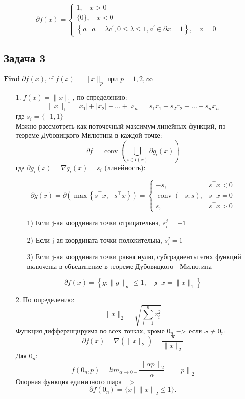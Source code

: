 \documentclass[12pt,letterpaper]{article}
\begin{document}
$$
\partial f(x)=\left\{\begin{array}{l}
1, \quad x>0 \\
\{0\}, \quad x<0 \\
\left\{a \mid a=\lambda a^{\prime}, 0 \leq \lambda \leq 1, a^{\prime} \in \partial x = 1 \right\}, \quad x=0
\end{array}\right.
$$

\subsection*{Задача 3}
$\textbf{Find}$ $\partial f(x)$, if $f(x) = \|x\|_p$ $\textbf{при}$ $p = 1,2, \infty$\\

\begin{itemize}
	\item[1. ] $ f(x) = \| x \|_1 $, по определению:
	$$
\|x\|_{1}=\left|x_{1}\right|+\left|x_{2}\right|+\ldots+\left|x_{n}\right|=s_{1} x_{1}+s_{2} x_{2}+\ldots+s_{n} x_{n}
$$
где $ s_i = \{ -1, 1 \} $\\
Можно рассмотреть как поточечный максимум линейных функций, по теореме Дубовицкого-Милютина в каждой точке:
$$
\partial f=\operatorname{conv}\left(\bigcup_{i \in I\left(x\right)} \partial g_{i}(x)\right)
$$
где $ \partial g_i(x) = \nabla g_i(x) = s_i $ (линейность):

$$
\partial g(x)=\partial\left(\max \left\{s^{\top} x,-s^{\top} x\right\}\right)=\left\{\begin{array}{ll}
-s, & s^{\top} x<0 \\
\operatorname{conv}(-s ; s), & s^{\top} x=0 \\
s, & s^{\top} x>0
\end{array}\right.
$$

\begin{itemize}
\item[1) ]  Если j-ая координата точки отрицательна, $s_i^j = -1$
\item[2) ] Если j-ая координата точки положительна, $s_i^j = 1$
\item[3) ] Если j-ая координата точки равна нулю, субградиенты этих функций включены в объединение в теореме Дубовицкого - Милютина
\end{itemize}

$$
\partial f(x)=\left\{g:\|g\|_{\infty} \leq 1, \quad g^{\top} x=\|x\|_{1}\right\}
$$


	\item[2. ] По определению:
$$
\|x\|_{2}= \sqrt{\sum\limits_{i=1}^n x_i^2} 
$$ 
Функция дифференцируема во всех точках, кроме $0_n$ => если $x\neq0_n$:
$$
\partial f(x) = \nabla (\|x\|_{2}) = \frac{\textbf{x} }{\| x \|_2} 
$$
Для $0_n$:
$$f(0_n, p)=lim _{\alpha\rightarrow0+}\frac{{\parallel\alpha p\parallel}_2}{\alpha}={\parallel p\parallel}_2$$
Опорная функция единичного шара => $$\partial f(0_n)=\{x\mid{\parallel x\parallel}_2\leqslant1\}.$$


\end{itemize}
\end{document}

